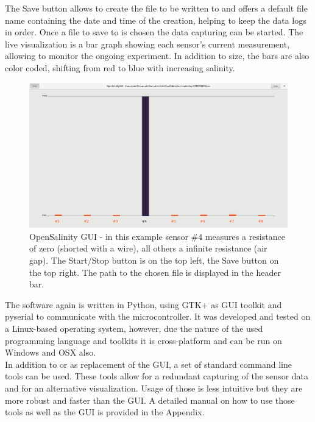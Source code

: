 The Save button allows to create the file to be written to and offers a default file name containing the date and time of the creation, helping to keep the data logs in order. Once a file to save to is chosen the data capturing can be started.
The live visualization is a bar graph showing each sensor's current measurement, allowing to monitor the ongoing experiment. In addition to size, the bars are also color coded, shifting from red to blue with increasing salinity.\\

\begin{figure}[H]
	\begin{center}
		\includegraphics[width=\textwidth]{images/UI.png}
		\caption[OpenSalinity GUI]{OpenSalinity GUI - in this example sensor $\#4$ measures a resistance of zero (shorted with a wire), all others a infinite resistance (air gap). The Start/Stop button is on the top left, the Save button on the top right. The path to the chosen file is displayed in the header bar.}
		\label{fig:opamp}
	\end{center}
\end{figure}

The software again is written in Python, using GTK+ as GUI toolkit and pyserial to communicate with the microcontroller. It was developed and tested on a Linux-based operating system, however, due the nature of the used programming language and toolkits it is cross-platform and can be run on Windows and OSX also.\\

In addition to or as replacement of the GUI, a set of standard command line tools can be used. These tools allow for a redundant capturing of the sensor data and for an alternative visualization. Usage of those is less intuitive but they are more robust and faster than the GUI. A detailed manual on how to use those tools as well as the GUI is provided in the Appendix.

